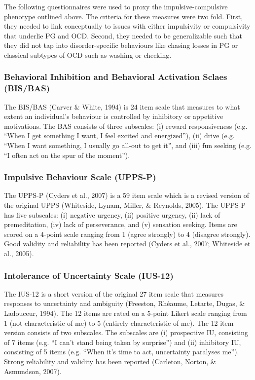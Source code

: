 The following questionnaires were used to proxy the impulsive-compulsive phenotype outlined above. The criteria for these measures were two fold. First, they needed to link conceptually to issues with either impulsivity or compulsivity that underlie PG and OCD. Second, they needed to be generalizable such that they did not tap into disorder-specific behaviours like chasing losses in PG or classical subtypes of OCD such as washing or checking.

\subsubsection{Behavioral Inhibition and Behavioral Activation Sclaes (BIS/BAS)} 
The BIS/BAS (Carver & White, 1994) is 24 item scale that measures to what extent an individual’s behaviour is controlled by inhibitory or appetitive motivations. The BAS consists of three subscales: (i) reward responsiveness (e.g. “When I get something I want, I feel excited and energized”), (ii) drive (e.g. “When I want something, I usually go all-out to get it”, and (iii) fun seeking (e.g. “I often act on the spur of the moment”).

\subsubsection{Impulsive Behaviour Scale (UPPS-P)}
The UPPS-P (Cyders et al., 2007) is a 59 item scale which is a revised version of the original UPPS (Whiteside, Lynam, Miller, & Reynolds, 2005).  The UPPS-P has five subscales: (i) negative urgency, (ii) positive urgency, (ii) lack of premeditation, (iv) lack of perseverance, and (v) sensation seeking. Items are scored on a 4-point scale ranging from 1 (agree strongly) to 4 (disagree strongly). Good validity and reliability has been reported (Cyders et al., 2007; Whiteside et al., 2005).

\subsubsection{Intolerance of Uncertainty Scale (IUS-12)}
The IUS-12 is a short version of the original 27 item scale that measures responses to uncertainty and ambiguity (Freeston, Rhéaume, Letarte, Dugas, & Ladouceur, 1994).  The 12 items are rated on a 5-point Likert scale ranging from 1 (not characteristic of me) to 5 (entirely characteristic of me). The 12-item version consists of two subscales. The subscales are (i) prospective IU, consisting of 7 items (e.g. “I can’t stand being taken by surprise”) and (ii) inhibitory IU, consisting of 5 items (e.g. “When it’s time to act, uncertainty paralyses me”).  Strong reliability and validity has been reported (Carleton, Norton, & Asmundson, 2007).

